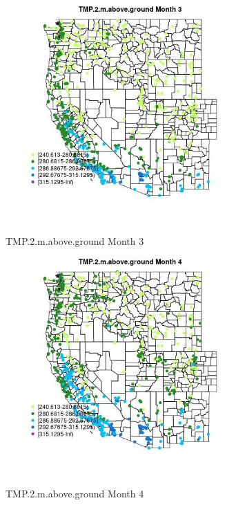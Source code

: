 \begin{figure} 
\centering  
\includegraphics[width=0.77\textwidth]{Code_Outputs/Report_ML_input_PM25_Step4_part_f_de_duplicated_aveswNAs_MapObsMo3TMP2maboveground.jpg} 
\caption{\label{fig:Report_ML_input_PM25_Step4_part_f_de_duplicated_aveswNAsMapObsMo3TMP2maboveground}TMP.2.m.above.ground Month 3} 
\end{figure} 
 

\begin{figure} 
\centering  
\includegraphics[width=0.77\textwidth]{Code_Outputs/Report_ML_input_PM25_Step4_part_f_de_duplicated_aveswNAs_MapObsMo4TMP2maboveground.jpg} 
\caption{\label{fig:Report_ML_input_PM25_Step4_part_f_de_duplicated_aveswNAsMapObsMo4TMP2maboveground}TMP.2.m.above.ground Month 4} 
\end{figure} 
 


